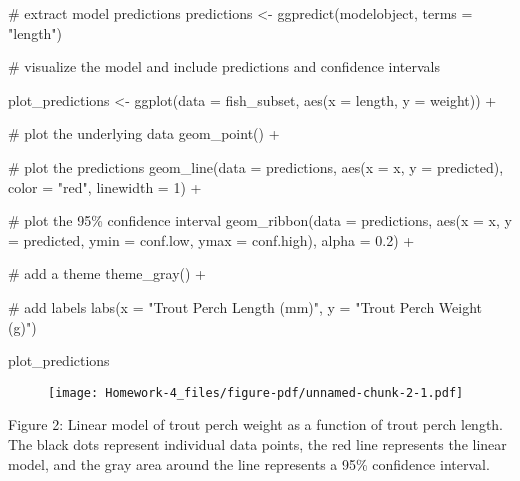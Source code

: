 \documentclass[
  letterpaper,
  DIV=11,
  numbers=noendperiod]{scrartcl}
\newenvironment{Shaded}{\begin{snugshade}}{\end{snugshade}}
\newcommand{\AttributeTok}[1]{\textcolor[rgb]{0.40,0.45,0.13}{#1}}
\newcommand{\CommentTok}[1]{\textcolor[rgb]{0.37,0.37,0.37}{#1}}
\newcommand{\DecValTok}[1]{\textcolor[rgb]{0.68,0.00,0.00}{#1}}
\newcommand{\FloatTok}[1]{\textcolor[rgb]{0.68,0.00,0.00}{#1}}
\newcommand{\FunctionTok}[1]{\textcolor[rgb]{0.28,0.35,0.67}{#1}}
\newcommand{\NormalTok}[1]{\textcolor[rgb]{0.00,0.23,0.31}{#1}}
\newcommand{\OtherTok}[1]{\textcolor[rgb]{0.00,0.23,0.31}{#1}}
\newcommand{\SpecialCharTok}[1]{\textcolor[rgb]{0.37,0.37,0.37}{#1}}
\newcommand{\StringTok}[1]{\textcolor[rgb]{0.13,0.47,0.30}{#1}}
\begin{document}
\begin{Shaded}
\begin{Highlighting}[]
\CommentTok{\# extract model predictions}
\NormalTok{predictions }\OtherTok{\textless{}{-}} \FunctionTok{ggpredict}\NormalTok{(modelobject, }\AttributeTok{terms =} \StringTok{"length"}\NormalTok{)}

\CommentTok{\# visualize the model and include predictions and confidence intervals}

\NormalTok{plot\_predictions }\OtherTok{\textless{}{-}} \FunctionTok{ggplot}\NormalTok{(}\AttributeTok{data =}\NormalTok{ fish\_subset, }\FunctionTok{aes}\NormalTok{(}\AttributeTok{x =}\NormalTok{ length, }\AttributeTok{y =}\NormalTok{ weight)) }\SpecialCharTok{+}
  
  \CommentTok{\# plot the underlying data}
  \FunctionTok{geom\_point}\NormalTok{() }\SpecialCharTok{+}
  
  \CommentTok{\# plot the predictions}
  \FunctionTok{geom\_line}\NormalTok{(}\AttributeTok{data =}\NormalTok{ predictions, }
            \FunctionTok{aes}\NormalTok{(}\AttributeTok{x =}\NormalTok{ x, }\AttributeTok{y =}\NormalTok{ predicted), }
            \AttributeTok{color =} \StringTok{"red"}\NormalTok{,}
            \AttributeTok{linewidth =} \DecValTok{1}\NormalTok{) }\SpecialCharTok{+}
  
  \CommentTok{\# plot the 95\% confidence interval}
  \FunctionTok{geom\_ribbon}\NormalTok{(}\AttributeTok{data =}\NormalTok{ predictions, }
              \FunctionTok{aes}\NormalTok{(}\AttributeTok{x =}\NormalTok{ x, }\AttributeTok{y =}\NormalTok{ predicted, }\AttributeTok{ymin =}\NormalTok{ conf.low, }\AttributeTok{ymax =}\NormalTok{ conf.high),}
              \AttributeTok{alpha =} \FloatTok{0.2}\NormalTok{) }\SpecialCharTok{+}
  
  \CommentTok{\# add a theme}
  \FunctionTok{theme\_gray}\NormalTok{() }\SpecialCharTok{+}
  
  \CommentTok{\# add labels}
  \FunctionTok{labs}\NormalTok{(}\AttributeTok{x =} \StringTok{"Trout Perch Length (mm)"}\NormalTok{,}
       \AttributeTok{y =} \StringTok{"Trout Perch Weight (g)"}\NormalTok{)}

\NormalTok{plot\_predictions}
\end{Highlighting}
\end{Shaded}

\begin{figure}[H]

{\centering \texttt{[image: Homework-4\_files/figure-pdf/unnamed-chunk-2-1.pdf]}

}

\end{figure}

Figure 2: Linear model of trout perch weight as a function of trout
perch length. The black dots represent individual data points, the red
line represents the linear model, and the gray area around the line
represents a 95\% confidence interval.
\end{document}
